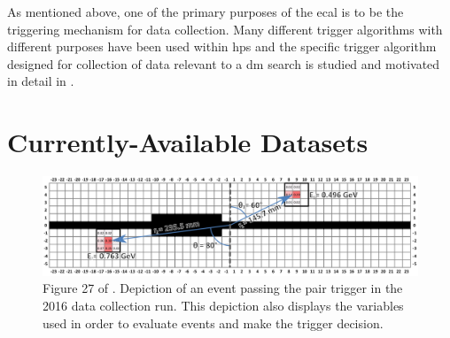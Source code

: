 As mentioned above, one of the primary purposes of the \ac{ecal} is to be the triggering mechanism
for data collection. Many different trigger algorithms with different purposes have been used within
\ac{hps} and the specific trigger algorithm designed for collection of data relevant to a \ac{dm}
search is studied and motivated in detail in \cite{skmccarty-thesis-2020}.

\section{Currently-Available Datasets}

\begin{figure}
	\centering
	\includegraphics[width=\textwidth]{figures/hps/experiment/smckarty-thesis-fig-27-pair-trigger-depiction.png}
	\caption{
		Figure 27 of \cite{skmccarty-thesis-2020}. Depiction of an event passing the pair trigger
		in the 2016 data collection run. This depiction also displays the variables used in order
		to evaluate events and make the trigger decision.
	}
	\label{fig:hps-pair-trigger-depiction}
\end{figure}